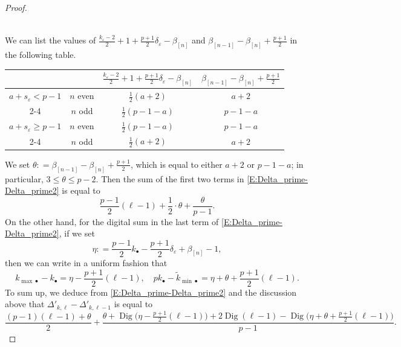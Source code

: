 \begin{proof}
\begin{small}
\begin{align*}
    \end{align*}\end{small}We can list the values of $\frac{k_\varepsilon - 2}2+1+\frac{p+1}2 \delta_\varepsilon -\beta_{[n]}$ and $\beta_{[n-1]}-\beta_{[n]}+\frac{p+1}2$ in the following table.
    \begin{center}
    \begin{tabular}{|c|c|c|c|}
    \hline
    & &$\frac{k_\varepsilon - 2}2+1+\frac{p+1}2 \delta_\varepsilon -\beta_{[n]}$ & $\beta_{[n-1]}-\beta_{[n]}+\frac{p+1}2$
    \\
    \hline
    $a+s_\varepsilon < p-1$ & $n$ even & $\frac 12(a+2)$ & $a+2$
    \\
    \cline{2-4}
    & $n$ odd & $\frac 12(p-1-a)$ & $p-1-a$
    \\
    \hline
    $a+s_\varepsilon \geq p-1$ & $n$ even & $\frac 12(p-1-a)$ & $p-1-a$
    \\
    \cline{2-4} & $n$ odd & $\frac 12(a+2)$ & $a+2$
    \\
    \hline
    \end{tabular}
    \end{center}
    We set $\theta: = \beta_{[n-1]}-\beta_{[n]}+\frac{p+1}2$, which is equal to either $a+2$ or $p-1-a$; in particular, $3\leq \theta \leq p-2$. Then the sum of the first two terms in \eqref{E:Delta_prime-Delta_prime2} is equal to
    $$
    \frac{p-1}2(\ell-1) + \frac 12\cdot  \theta + \frac{\theta}{p-1}.
    $$
    On the other hand,
    for the digital sum in the last term of \eqref{E:Delta_prime-Delta_prime2}, if we set
    \begin{equation}
    \label{E:eta}
    \eta: = \frac{p-1}2k_\bullet -\frac{p+1}2\delta_\varepsilon + \beta_{[n]}-1,
    \end{equation}
    then we can write in a uniform fashion that
    \begin{equation}
    \label{E:kmax_-_k}
    k_{{\max}\bullet}-k_\bullet = \eta - \frac{p+1}2 (\ell-1) , \quad pk_\bullet -\tilde k_{{\min}\bullet} =\eta+\theta +\frac{p+1}2(\ell-1).
    \end{equation}
    To sum up, we deduce from \eqref{E:Delta_prime-Delta_prime2} and the discussion above that $\Delta'_{k, \ell} - \Delta'_{k, \ell-1}$ is equal to
    \begin{equation}
    \label{E:Delta_prime-Delta_prime3}
    \frac {(p-1) (\ell-1) + \theta}2+ \frac{\theta + {\operatorname{Dig}}\big(\eta -\frac{p+1}2(\ell-1)\big) + 2{\operatorname{Dig}}(\ell-1) - {\operatorname{Dig}}\big(\eta +\theta+\frac{p+1}2(\ell-1)\big)}{p-1}.

\end{equation}
\end{proof}
